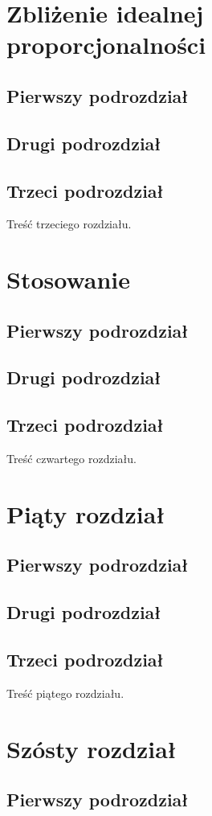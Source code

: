 \documentclass[12pt,a4paper,titlepage]{report}
\begin{document}
\newpage
\chapter{Zbliżenie idealnej proporcjonalności}
\section{Pierwszy podrozdział}
\section{Drugi podrozdział}
\section{Trzeci podrozdział}
Treść trzeciego rozdziału.
\newpage
\chapter{Stosowanie}
\section{Pierwszy podrozdział}
\section{Drugi podrozdział}
\section{Trzeci podrozdział}
Treść czwartego rozdziału.
\newpage
\chapter{Piąty rozdział}
\section{Pierwszy podrozdział}
\section{Drugi podrozdział}
\section{Trzeci podrozdział}
Treść piątego rozdziału.
\newpage
\chapter{Szósty rozdział}
\section{Pierwszy podrozdział}
\end{document}
